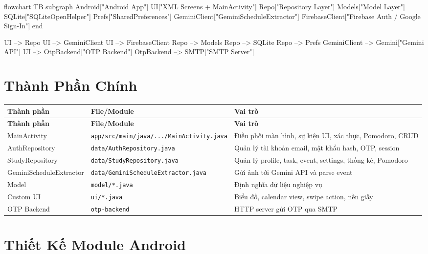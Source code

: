 \documentclass[12pt,a4paper]{report}
\begin{document}
\begin{CodeBlock}
flowchart TB
    subgraph Android["Android App"]
        UI["XML Screens + MainActivity"]
        Repo["Repository Layer"]
        Models["Model Layer"]
        SQLite["SQLiteOpenHelper"]
        Prefs["SharedPreferences"]
        GeminiClient["GeminiScheduleExtractor"]
        FirebaseClient["Firebase Auth / Google Sign-In"]
    end

    UI --> Repo
    UI --> GeminiClient
    UI --> FirebaseClient
    Repo --> Models
    Repo --> SQLite
    Repo --> Prefs
    GeminiClient --> Gemini["Gemini API"]
    UI --> OtpBackend["OTP Backend"]
    OtpBackend --> SMTP["SMTP Server"]
\end{CodeBlock}

\section{Thành Phần Chính}

\begin{longtable}{|>{\raggedright\arraybackslash}p{}|>{\raggedright\arraybackslash}p{}|>{\raggedright\arraybackslash}p{}|}
\hline
\textbf{Thành phần} & \textbf{File/Module} & \textbf{Vai trò} \\ \hline
\endfirsthead
\hline
\textbf{Thành phần} & \textbf{File/Module} & \textbf{Vai trò} \\ \hline
\endhead
MainActivity & \texttt{app/src/main/java/.../MainActivity.java} & Điều phối màn hình, sự kiện UI, xác thực, Pomodoro, CRUD \\ \hline
AuthRepository & \texttt{data/AuthRepository.java} & Quản lý tài khoản email, mật khẩu hash, OTP, session \\ \hline
StudyRepository & \texttt{data/StudyRepository.java} & Quản lý profile, task, event, settings, thống kê, Pomodoro \\ \hline
GeminiScheduleExtractor & \texttt{data/GeminiScheduleExtractor.java} & Gửi ảnh tới Gemini API và parse event \\ \hline
Model & \texttt{model/*.java} & Định nghĩa dữ liệu nghiệp vụ \\ \hline
Custom UI & \texttt{ui/*.java} & Biểu đồ, calendar view, swipe action, nền giấy \\ \hline
OTP Backend & \texttt{otp-backend} & HTTP server gửi OTP qua SMTP \\ \hline
\end{longtable}

\section{Thiết Kế Module Android}
\end{document}
